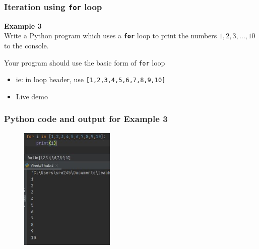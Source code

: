 \documentclass[english,14pt]{beamer}
\begin{document}

\begin{frame}[fragile]

\frametitle{}

\frametitle{Iteration using \texttt{for} loop}

\textbf{Example 3}\\
\vspace*{5mm}
Write a Python program which uses a \textbf{\texttt{for}} loop to print the numbers $1, 2, 3, \ldots, 10$ to the console. \\
\vspace*{5mm}

Your program should use the basic form of \texttt{for} loop
\begin{itemize}
	\item ie: in loop header, use \verb+[1,2,3,4,5,6,7,8,9,10]+
\end{itemize}

\vspace*{10mm}

\begin{itemize}
	\item Live demo
\end{itemize}
	
\end{frame}


\begin{frame}[fragile]

\frametitle{Python code and output for Example 3}

\begin{figure}[ht]
	\centering
	\includegraphics[width=0.4\textwidth]{figures/Week3ThuEx3}
\end{figure}

\end{frame}
\end{document}
